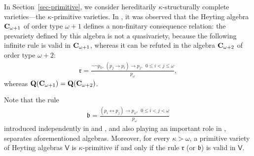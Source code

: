 \documentclass[submission,copyright,creativecommons]{eptcs}
\theoremstyle{definition}
\newcommand{\alg}[1]{{{\textbf{\upshape #1}}}}
\newcommand{\QQ}{\mathbf{Q}}
\newcommand{\vv}[1]{\mathsf {#1}}
\newcommand{\bb}{\mathfrak{b}}
\newcommand{\kk}{\kappa}
\begin{document}
In Section~\ref{sec-primitive}, we consider hereditarily $\kk$-structurally complete varieties—the $\kk$-primitive varieties. In \cite{Citkin1978}, it was observed that the Heyting algebra $\alg C_{\omega+1}$ of order type $\omega + 1$ defines a non-finitary consequence relation: the prevariety defined by this algebra is not a quasivariety, because the following infinite rule is valid in $\alg C_{\omega+1}$, whereas it can be refuted in the algebra $\alg C_{\omega+2}$ of order type $\omega + 2$:
\begin{align*}
	\mathfrak{r} = \frac{\neg\neg p_0,\ (p_j \to p_i) \to p_j,\ \ 0 \leq i < j \leq \omega}{p_\omega},
\end{align*}
whereas $\QQ(\alg C_{\omega+1}) = \QQ(\alg C_{\omega+2})$.

Note that the rule
\begin{align*}
	\bb = \frac{(p_i \leftrightarrow p_j) \to p_\omega,\ \ 0 \leq i < j < \omega}{p_\omega}
\end{align*}
introduced independently in \cite{PrucnalStructural1985} and \cite{RautenbergNote1985}, and also playing an important role in \cite{WojtylakSyntactical1990, WojtylakStructural1991}, separates aforementioned algebras. Moreover, for every $\kk > \omega$, a primitive variety of Heyting algebras $\vv V$ is $\kk$-primitive if and only if the rule $\mathfrak{r}$ (or $\bb$) is valid in $\vv V$.
\end{document}
